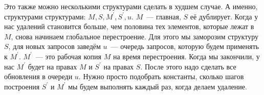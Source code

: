Это также можно несколькими структурами сделать в худшем случае. А именно, структурами структурами: $M,S,M^\prime,S^\prime,u$. $M$~--- главная, $S$ её дублирует. Когда у нас удалений становится больше, чем половина тех элементов, которые лежат в $M$, снова начинаем глобальное перестроение. Для этого мы заморозим структуру $S$, для новых запросов заведём $ u$~--- очередь запросов, которую будем применять к $M^\prime$. $M^\prime$~--- это рабочая копия $M$ на время перестроения. Когда мы закончили, у нас $M^\prime$ будет на правах $M$ и $S^\prime$ на правах $S$. После этого надо сделать все обновления в очереди $u$. Нужно просто подобрать константы, сколько шагов построения $S^\prime$ и $M^\prime$ мы будем выполнять каждый раз, когда делаем удаление.
